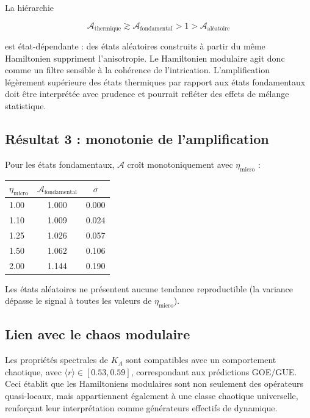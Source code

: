 \documentclass[11pt]{article}
\begin{document}
La hiérarchie

\[
\mathcal{A}_{\mathrm{thermique}} \gtrsim \mathcal{A}_{\mathrm{fondamental}} > 1 > \mathcal{A}_{\mathrm{aléatoire}}
\]

est état-dépendante : des états aléatoires construits à partir du même Hamiltonien suppriment l'anisotropie. Le Hamiltonien modulaire agit donc comme un filtre sensible à la cohérence de l'intrication. L'amplification légèrement supérieure des états thermiques par rapport aux états fondamentaux doit être interprétée avec prudence et pourrait refléter des effets de mélange statistique.

\subsection{Résultat 3 : monotonie de l'amplification}

Pour les états fondamentaux, $\mathcal{A}$ croît monotoniquement avec $\eta_{\mathrm{micro}}$ :

\begin{center}
\begin{tabular}{lcc}
\toprule
$\eta_{\mathrm{micro}}$ & $\mathcal{A}_{\mathrm{fondamental}}$ & $\sigma$ \\
\midrule
1.00 & 1.000 & 0.000 \\
1.10 & 1.009 & 0.024 \\
1.25 & 1.026 & 0.057 \\
1.50 & 1.062 & 0.106 \\
2.00 & 1.144 & 0.190 \\
\bottomrule
\end{tabular}
\end{center}

Les états aléatoires ne présentent aucune tendance reproductible (la variance dépasse le signal à toutes les valeurs de $\eta_{\mathrm{micro}}$).

\subsection{Lien avec le chaos modulaire}

Les propriétés spectrales de $K_A$ sont compatibles avec un comportement chaotique, avec $\langle r \rangle \in [0.53, 0.59]$, correspondant aux prédictions GOE/GUE. Ceci établit que les Hamiltoniens modulaires sont non seulement des opérateurs quasi-locaux, mais appartiennent également à une classe chaotique universelle, renforçant leur interprétation comme générateurs effectifs de dynamique.
\end{document}
